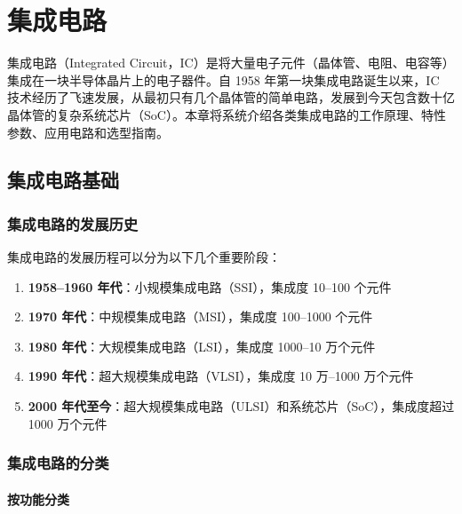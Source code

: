 \chapter{集成电路}

集成电路（Integrated Circuit，IC）是将大量电子元件（晶体管、电阻、电容等）集成在一块半导体晶片上的电子器件。自 1958 年第一块集成电路诞生以来，IC 技术经历了飞速发展，从最初只有几个晶体管的简单电路，发展到今天包含数十亿晶体管的复杂系统芯片（SoC）。本章将系统介绍各类集成电路的工作原理、特性参数、应用电路和选型指南。

\section{集成电路基础}

\subsection{集成电路的发展历史}

集成电路的发展历程可以分为以下几个重要阶段：

\begin{enumerate}
  \item \textbf{1958--1960 年代}：小规模集成电路（SSI），集成度 10--100 个元件
  \item \textbf{1970 年代}：中规模集成电路（MSI），集成度 100--1000 个元件
  \item \textbf{1980 年代}：大规模集成电路（LSI），集成度 1000--10 万个元件
  \item \textbf{1990 年代}：超大规模集成电路（VLSI），集成度 10 万--1000 万个元件
  \item \textbf{2000 年代至今}：超大规模集成电路（ULSI）和系统芯片（SoC），集成度超过 1000 万个元件
\end{enumerate}

\subsection{集成电路的分类}

\subsubsection{按功能分类}

